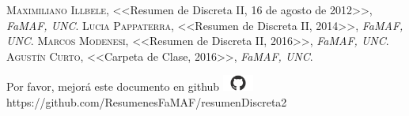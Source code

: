 \documentclass[12pt,a4paper]{report}
\begin{document}
\begin{thebibliography}{X}
 \textsc{Maximiliano Illbele},
<<Resumen de Discreta II, 16 de agosto de 2012>>,
\textit{FaMAF, UNC}.
 \textsc{Lucia Pappaterra},
<<Resumen de Discreta II, 2014>>,
\textit{FaMAF, UNC}.
 \textsc{Marcos Modenesi},
<<Resumen de Discreta II, 2016>>,
\textit{FaMAF, UNC}.
 \textsc{Agustín Curto},
<<Carpeta de Clase, 2016>>,
\textit{FaMAF, UNC}.
\end{thebibliography}

\vspace{\fill}
\begin{center}
Por favor, mejorá este documento en github
\includegraphics[width=1cm]{graphics/github.png} \\
https://github.com/ResumenesFaMAF/resumenDiscreta2
\end{center}
\end{document}
